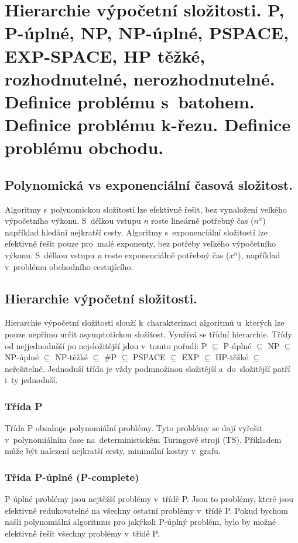 \section{Hierarchie výpočetní složitosti. P, P-úplné, NP, NP-úplné, PSPACE, EXP-SPACE, HP těžké, rozhodnutelné, nerozhodnutelné. Definice problému s~batohem. Definice problému k-řezu. Definice problému obchodu.}

\subsection{Polynomická vs exponenciální časová složitost.}

Algoritmy s~polynomickou složitostí lze efektivně řešit, bez vynaložení velkého výpočetního výkonu.
S~délkou vstupu \textit{n} roste lineárně potřebný čas ($n^x$) například hledání nejkratší cesty.
Algoritmy s~exponenciální složitostí lze efektivně řešit pouze pro~malé exponenty, bez potřeby velkého výpočetního výkonu.
S~délkou vstupu \textit{n} roste exponenciálně potřebný čas ($x^n$), například v~problému obchodního cestujícího.

\subsection{Hierarchie výpočetní složitosti.}

Hierarchie výpočetní složitosti slouží k~charakterizaci algoritmů u~kterých lze pouze nepřímo určit asymptotickou složitost.
Využívá se třídní hierarchie.
Třídy od nejjednodušší po nejsložitější jdou v~tomto pořadí: P $\subseteq$ P-úplné $\subseteq$ NP $\subseteq$ NP-úplné $\subseteq$ NP-těžké $\subseteq$ \#P $\subseteq$ PSPACE $\subseteq$ EXP $\subseteq$ HP-těžké $\subseteq$ neřešitelné.
Jednoduší třída je vždy podmnožinou složitější a~do~složitější patří i~ty jednoduší.

\subsubsection{Třída P}

Třída P obsahuje polynomiální problémy.
Tyto problémy se dají vyřešit v~polynomiálním čase na~deterministickém Turingově stroji (TS).
Příkladem může být nalezení nejkratší cesty, minimální kostry v~grafu.


\subsubsection{Třída P-úplné (P-complete)}
P-úplné problémy jsou nejtěžší problémy v~třídě P. Jsou to problémy, které jsou efektivně redukovatelné na všechny ostatní problémy v~třídě P. Pokud bychom našli polynomiální algoritmus pro jakýkoli P-úplný problém, bylo by možné efektivně řešit všechny problémy v~třídě P.

